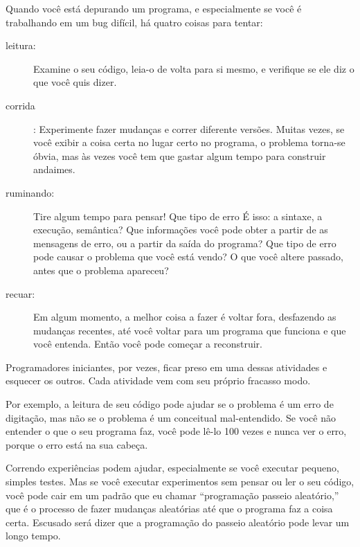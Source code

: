 \documentclass[10pt]{book}
\begin{document}
\begin{exercise}
\begin{v erbatim}
{Quando você está depurando um programa, e especialmente se você é
trabalhando em um bug difícil, há quatro coisas para tentar:

\begin{description}

\item[leitura:] Examine o seu código, leia-o de volta para si mesmo, e
verifique se ele diz o que você quis dizer.

\item[corrida]: Experimente fazer mudanças e correr diferente
versões. Muitas vezes, se você exibir a coisa certa no lugar certo
no programa, o problema torna-se óbvia, mas às vezes você tem que
gastar algum tempo para construir andaimes.

\item[ruminando:] Tire algum tempo para pensar! Que tipo de erro
É isso: a sintaxe, a execução, semântica? Que informações você pode obter a partir de
as mensagens de erro, ou a partir da saída do programa? Que tipo de
erro pode causar o problema que você está vendo? O que você altere
passado, antes que o problema apareceu?

\item[recuar:] Em algum momento, a melhor coisa a fazer é voltar
fora, desfazendo as mudanças recentes, até você voltar para um programa que
funciona e que você entenda. Então você pode começar a reconstruir.

\end{description}

Programadores iniciantes, por vezes, ficar preso em uma dessas atividades
e esquecer os outros. Cada atividade vem com seu próprio fracasso
modo.

Por exemplo, a leitura de seu código pode ajudar se o problema é um
erro de digitação, mas não se o problema é um conceitual
mal-entendido. Se você não entender o que o seu programa faz, você
pode lê-lo 100 vezes e nunca ver o erro, porque o erro está na
sua cabeça.

Correndo experiências podem ajudar, especialmente se você executar pequeno, simples
testes. Mas se você executar experimentos sem pensar ou ler o seu
código, você pode cair em um padrão que eu chamar ``programação passeio aleatório,''
que é o processo de fazer mudanças aleatórias até que o programa
faz a coisa certa. Escusado será dizer que a programação do passeio aleatório
pode levar um longo tempo.

}
\end{v erbatim}
\end{exercise}
\end{document}
